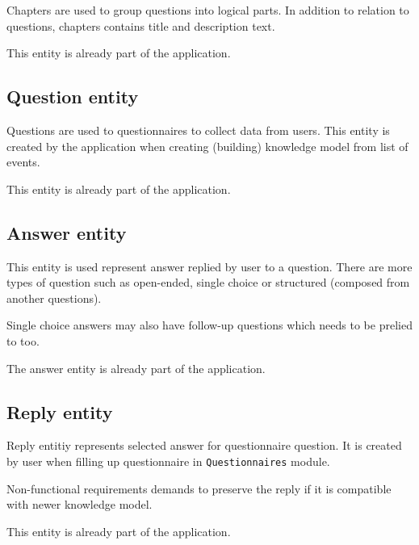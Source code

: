 Chapters are used to group questions into logical parts.
In addition to relation to questions, chapters contains title and description text.

This entity is already part of the application.

\subsection{Question entity}

Questions are used to questionnaires to collect data from users.
This entity is created by the application when creating (building) knowledge model from list of events.

This entity is already part of the application.

\subsection{Answer entity}

This entity is used represent answer replied by user to a question.
There are more types of question such as open-ended, single choice or structured (composed from another questions).

Single choice answers may also have follow-up questions which needs to be prelied to too.

The answer entity is already part of the application.

\subsection{Reply entity}

Reply entitiy represents selected answer for questionnaire question.
It is created by user when filling up questionnaire in \texttt{Questionnaires} module.

Non-functional requirements demands to preserve the reply if it is compatible with newer knowledge model.

This entity is already part of the application.
